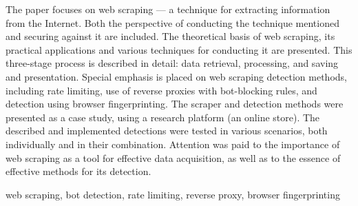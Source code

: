 \abstract
The paper focuses on web scraping --- a technique for extracting information from the Internet.
Both the perspective of conducting the technique mentioned and securing against it are included.
The theoretical basis of web scraping, its practical applications and various techniques for conducting it are presented.
This three-stage process is described in detail: data retrieval, processing, and saving and presentation.
Special emphasis is placed on web scraping detection methods, including rate limiting,
use of reverse proxies with bot-blocking rules, and detection using browser fingerprinting.
The scraper and detection methods were presented as a case study, using a research platform (an online store).
The described and implemented detections were tested in various scenarios, both individually and in their combination.
Attention was paid to the importance of web scraping as a tool for effective data acquisition, as well as to the essence of effective methods for its detection.

\keywords web scraping, bot detection, rate limiting, reverse proxy, browser fingerprinting